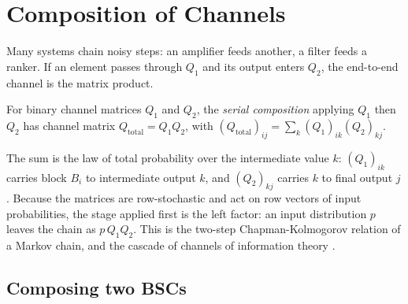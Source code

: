 %
%
%

\section{Composition of Channels}
\label{sec:channel-composition}

Many systems chain noisy steps: an amplifier feeds another, a filter feeds a
ranker. If an element passes through $Q_1$ and its output enters $Q_2$, the
end-to-end channel is the matrix product.

\begin{definition}
\label{def:channel-composition}
For binary channel matrices $Q_1$ and $Q_2$, the \emph{serial
composition} applying $Q_1$ then $Q_2$ has
channel matrix $Q_{\mathrm{total}} = Q_1 Q_2$, with $(Q_{\mathrm{total}})_{ij} =
\sum_k (Q_1)_{ik}(Q_2)_{kj}$.
\end{definition}

The sum is the law of total probability over the intermediate value $k$:
$(Q_1)_{ik}$ carries block $B_i$ to intermediate output $k$, and $(Q_2)_{kj}$
carries $k$ to final output $j$. Because the matrices are row-stochastic and act
on row vectors of input probabilities, the stage applied first is the left
factor: an input distribution $p$ leaves the chain as $p\,Q_1 Q_2$. This is the
two-step Chapman-Kolmogorov relation of a Markov chain, and the cascade of
channels of information theory \parencite{cover-thomas}.

\subsection*{Composing two BSCs}

